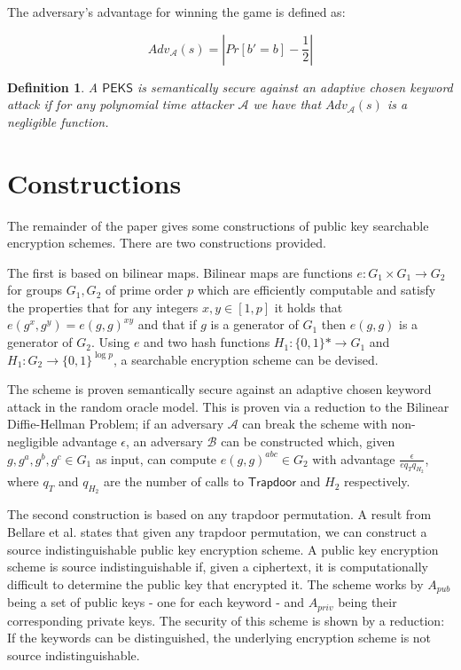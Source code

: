 \documentclass[a4paper,11pt]{article}
\newtheorem{definition}{Definition}
\begin{document}
    The adversary's advantage for winning the game is defined as:

    $$Adv_{\mathcal{A}}(s) = |Pr[b' = b] - \frac{1}{2}|$$

    \begin{definition}
        A $\mathsf{PEKS}$ is semantically secure against an adaptive chosen keyword attack if for any polynomial time attacker $\mathcal{A}$ we have that $Adv_{\mathcal{A}}(s)$ is a negligible function.
    \end{definition}

    \section{Constructions}

    The remainder of the paper gives some constructions of public key searchable encryption schemes. There are two constructions provided.

    The first is based on bilinear maps. Bilinear maps are functions $e:G_1 \times G_1 \to G_2$ for groups $G_1, G_2$ of prime order $p$ which are efficiently computable and satisfy the properties that for any integers $x, y \in [1,p]$ it holds that $e(g^x, g^y) = e(g, g)^{xy}$ and that if $g$ is a generator of $G_1$ then $e(g, g)$ is a generator of $G_2$. Using $e$ and two hash functions $H_1: \{0, 1\}* \to G_1$ and $H_1: G_2 \to \{0, 1\}^{\log p}$, a searchable encryption scheme can be devised.

    The scheme is proven semantically secure against an adaptive chosen keyword attack in the random oracle model. This is proven via a reduction to the Bilinear Diffie-Hellman Problem; if an adversary $\mathcal{A}$ can break the scheme with non-negligible advantage $\epsilon$, an adversary $\mathcal{B}$ can be constructed which, given $g, g^a, g^b, g^c \in G_1$ as input, can compute $e(g, g)^{abc} \in G_2$ with advantage $\frac{\epsilon}{eq_Tq_{H_2}}$, where $q_T$ and $q_{H_2}$ are the number of calls to $\mathsf{Trapdoor}$ and $H_2$ respectively.

    The second construction is based on any trapdoor permutation. A result from Bellare et al. states that given any trapdoor permutation, we can construct a source indistinguishable public key encryption scheme. A public key encryption scheme is source indistinguishable if, given a ciphertext, it is computationally difficult to determine the public key that encrypted it. The scheme works by $A_{pub}$ being a set of public keys - one for each keyword - and $A_{priv}$ being their corresponding private keys. The security of this scheme is shown by a reduction: If the keywords can be distinguished, the underlying encryption scheme is not source indistinguishable.
\end{document}
